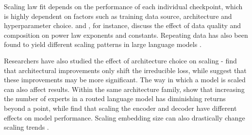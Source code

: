 













Scaling law fit depends on the performance of each individual checkpoint, which is highly dependent on factors such as training data source, architecture and hyperparameter choice. \citet{bansal2022data} and \citet{goyal2024scaling}, for instance, discuss the effect of data quality and composition on power law exponents and constants. Repeating data has also been found to yield different scaling patterns in large language models \citep{muennighoff2024scaling,goyal2024scaling}. 

Researchers have also studied the effect of architecture choice on scaling - \citet{hestness2017deep} find that architectural improvements only shift the irreducible loss, while \citet{poli2024mechanistic} suggest that these improvements may be more significant. The way in which a model is scaled can also affect results. Within the same architecture family, \citet{clark2022unified} show that increasing the number of experts in a routed language model has diminishing returns beyond a point, while \citet{ghorbani2021scaling} find that scaling the encoder and decoder have different effects on model performance. Scaling embedding size can also drastically change scaling trends \citep{tao2024scaling}.

